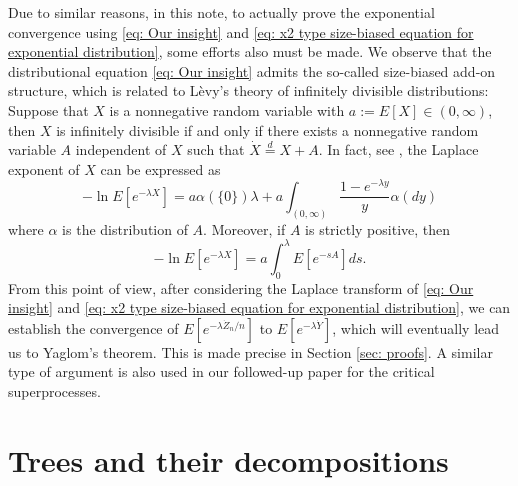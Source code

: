 \documentclass[12pt,a4paper]{amsart}
\numberwithin{equation}{section}
\begin{document}
	Due to similar reasons, in this note, 
	to actually prove the exponential convergence using \eqref{eq: Our insight} and \eqref{eq: x2 type size-biased equation for exponential distribution}, some efforts also must be made. 
	We observe that the distributional equation \eqref{eq: Our insight} admits the so-called size-biased add-on structure, which is related to L\`evy's theory of infinitely divisible distributions: Suppose that $X$ is a nonnegative random variable with $ a := E [X]\in (0,\infty)$, 
	then $X$ is infinitely divisible if and only if there exists a nonnegative random variable $A$ independent of $X$ such that $\dot X 	\overset{d} = X + A$. 
	In fact, see \cite[Theorem 10.1]{ArratiaGoldsteinKochman2013}, the Laplace exponent of $X$ can be expressed as
\[
	-\ln E[ e^{-\lambda X}] 
	=  a \alpha(\{0\}) \lambda+ a \int_{(0,\infty)} \frac{1 - e^{-\lambda y}}{y} \alpha(dy)
\]
	where $\alpha$ is the distribution of $A$.
	Moreover, if $A$ is strictly positive, then
\begin{equation}\label{eq: Laplace exponent for size-biased add-on equation}
	-\ln E[ e^{-\lambda X}] 
	=  a  \int_0^\lambda E [e^{-s A}] ds.
\end{equation}
	From this point of view, after considering the Laplace transform of \eqref{eq: Our insight} and \eqref{eq: x2 type size-biased equation for exponential distribution}, we can establish the convergence of $E[e^{-\lambda \dot Z_n/n}]$ to $E[e^{-\lambda \dot {Y}}]$, which will eventually lead us to Yaglom's theorem.
	This is made precise in Section \ref{sec: proofs}.
	A similar type of argument is also  used in our followed-up paper \cite{RenSongSun2017Spine} for the critical superprocesses.
	
	
\section{Trees and their decompositions}
\label{sec:preliminary}
\end{document}
